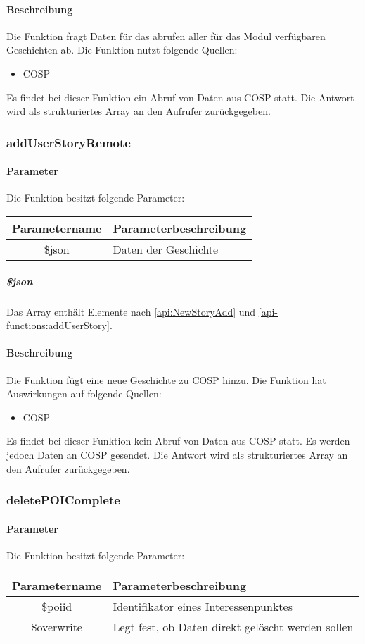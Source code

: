 \paragraph{Beschreibung} Die Funktion fragt Daten für das abrufen aller für das Modul verfügbaren Geschichten ab. Die Funktion nutzt folgende Quellen:
\begin{itemize}
	\item COSP
\end{itemize}
Es findet bei dieser Funktion ein Abruf von Daten aus {\glqq COSP\grqq} statt. Die Antwort wird als strukturiertes Array an den Aufrufer zurückgegeben.
\subsubsection{addUserStoryRemote}
\paragraph{Parameter} Die Funktion besitzt folgende Parameter:
\begin{table}[H]
	\begin{tabular}{|c|p{11cm}|}
		\hline
		\textbf{Parametername} & \textbf{Parameterbeschreibung} \\ \hline
		\$json & Daten der Geschichte \\ \hline
	\end{tabular}
\end{table}
\subparagraph{\$json}Das Array enthält Elemente nach \autoref{api:NewStoryAdd} und \autoref{api-functions:addUserStory}.
\paragraph{Beschreibung} Die Funktion fügt eine neue Geschichte zu {\glqq COSP\grqq} hinzu. Die Funktion hat Auswirkungen auf folgende Quellen:
\begin{itemize}
	\item COSP
\end{itemize}
Es findet bei dieser Funktion kein Abruf von Daten aus {\glqq COSP\grqq} statt. Es werden jedoch Daten an {\glqq COSP\grqq} gesendet. Die Antwort wird als strukturiertes Array an den Aufrufer zurückgegeben.
\subsubsection{deletePOIComplete}
\paragraph{Parameter} Die Funktion besitzt folgende Parameter:
\begin{table}[H]
	\begin{tabular}{|c|p{11cm}|}
		\hline
		\textbf{Parametername} & \textbf{Parameterbeschreibung} \\ \hline
		\$poiid     & Identifikator eines Interessenpunktes \\ \hline
		\$overwrite & Legt fest, ob Daten direkt gelöscht werden sollen \\ \hline
	\end{tabular}
\end{table}
